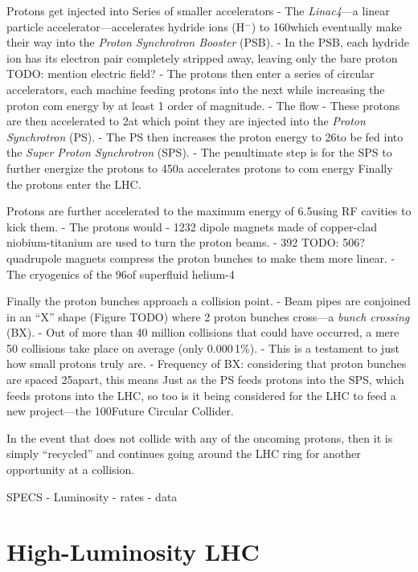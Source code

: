 Protons get injected into Series of smaller accelerators
    - The \emph{Linac4}---a linear particle accelerator---accelerates hydride ions (H$^-$) to 160\MeV which eventually make their way into the \emph{Proton Synchrotron Booster} (PSB).
    - In the PSB, each hydride ion has its electron pair completely stripped away, leaving only the bare proton TODO: mention electric field?
    - The protons then enter a series of circular accelerators, each machine feeding protons into the next while increasing the proton com energy by at least 1 order of magnitude.
    - The flow 
    - These protons are then accelerated to 2\GeV at which point they are injected into the \emph{Proton Synchrotron} (PS).
    - The PS then increases the proton energy to 26\GeV to be fed into the \emph{Super Proton Synchrotron} (SPS).
    - The penultimate step is for the SPS to further energize the protons to 450\GeV a accelerates protons to com energy
Finally the protons enter the LHC.

Protons are further accelerated to the maximum energy of 6.5\TeV using RF cavities to kick them.
- The protons would 
- 1232 dipole magnets made of copper-clad niobium-titanium are used to turn the proton beams.
- 392 TODO: 506? quadrupole magnets compress the proton bunches to make them more linear.
- The cryogenics of the 96\tonne of superfluid helium-4

Finally the proton bunches approach a collision point.
- Beam pipes are conjoined in an ``X'' shape (Figure TODO) where 2 proton bunches cross---a \emph{bunch crossing} (BX).
- Out of more than 40 million \pp collisions that could have occurred, a mere 50 collisions take place on average (\ie only 0.000\,1\%).
    - This is a testament to just how small protons truly are.
- Frequency of BX: considering that proton bunches are spaced 25\ns apart, this means 
Just as the PS feeds protons into the SPS, which feeds protons into the LHC, so too is it being considered for the LHC to feed a new project---the 100\Km Future Circular Collider.

In the event that \pname does not collide with any of the oncoming protons, then it is simply ``recycled'' and continues going around the LHC ring for another opportunity at a \pp collision.


SPECS
- Luminosity
- rates
- data

\section{High-Luminosity LHC}




